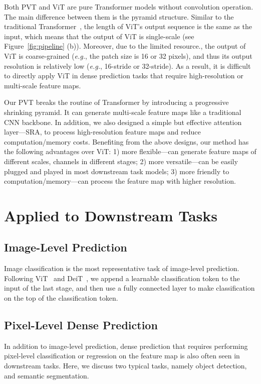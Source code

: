 \documentclass[10pt,twocolumn,letterpaper]{article}
\def\eg{\emph{e.g.}}
\begin{document}
Both PVT and ViT are pure Transformer models without convolution operation. The main difference between them is the pyramid structure. 
Similar to the traditional Transformer~\cite{vaswani2017attention}, the length of ViT's output sequence is the same as the input, which means that the output of ViT is single-scale (see Figure~\ref{fig:pipeline} (b)).
Moreover, due to the limited resource., the output of ViT is coarse-grained (\eg, the patch size is 16 or 32 pixels), and thus its output resolution is relatively low (\eg, 16-stride or 32-stride).
As a result, it is difficult to directly apply ViT in dense prediction tasks that require high-resolution or multi-scale feature maps.



Our PVT breaks the routine of Transformer by introducing a progressive shrinking pyramid.
It can generate multi-scale feature maps like a traditional CNN backbone.
In addition, we also designed a simple but
effective attention layer---SRA, to process high-resolution feature maps and reduce computation/memory costs.
Benefiting from the above designs, our method has the following advantages over ViT:
1) more flexible---can generate feature maps of different scales, channels in different stages;
2) more versatile---can be easily plugged and played in most downstream task models;
3) more friendly to computation/memory---can process the feature map with higher resolution.

\section{Applied to Downstream Tasks}
\label{sec:task}
\subsection{Image-Level Prediction}
Image classification is the most representative task of image-level prediction. Following ViT~\cite{dosovitskiy2020image} and DeiT~\cite{touvron2020training}, we append a learnable
classification token to the input of the last stage, and then use a fully connected layer to make classification on the top of the classification token.

\subsection{Pixel-Level Dense Prediction}
In addition to image-level prediction, dense prediction that requires performing pixel-level classification or regression on the feature map is also often seen in downstream tasks.
Here, we discuss two typical tasks, namely object detection, and semantic segmentation.
\end{document}
